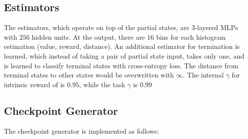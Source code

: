 \subsection{Estimators}

The estimators, which operate on top of the partial states, are $3$-layered MLPs with $256$ hidden units. At the output, there are $16$ bins for each histogram estimation (value, reward, distance). An additional estimator for termination is learned, which instead of taking a pair of partial state input, takes only one, and is learned to classify terminal states with cross-entropy loss. The distance from terminal states to other states would be overwritten with $\infty$. The internal $\gamma$ for intrinsic reward of \red{$\pi$} is $0.95$, while the task $\gamma$ is $0.99$

\subsection{Checkpoint Generator}
The checkpoint generator is implemented as follows:
